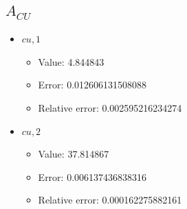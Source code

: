 \documentclass{article}%
\begin{document}
\subsection{$A_{CU}$}%
\begin{itemize}%
	\item $\textit{cu},1$%
	\begin{itemize}%
		\item Value: 4.844843%
		\item Error: 0.012606131508088%
		\item Relative error: 0.002595216234274%
	\end{itemize}%
	\item $\textit{cu},2$%
	\begin{itemize}%
		\item Value: 37.814867%
		\item Error: 0.006137436838316%
		\item Relative error: 0.000162275882161%
	\end{itemize}%
\end{itemize}%
\end{document}
